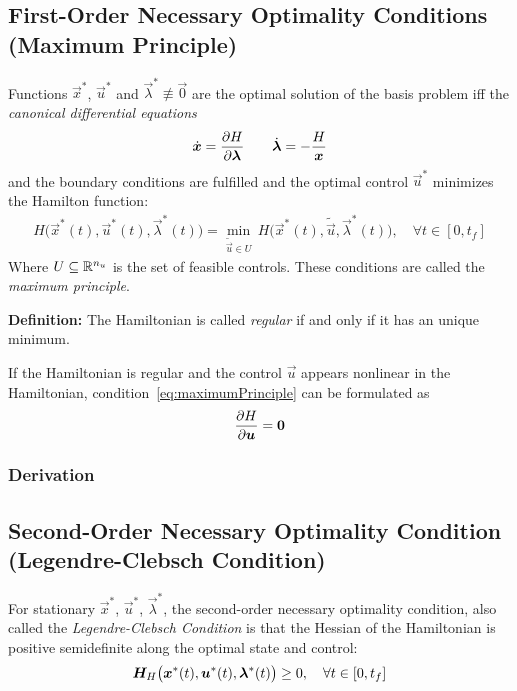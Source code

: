 		\subsection{First-Order Necessary Optimality Conditions (Maximum Principle)}
			Functions \( \vec{x}^\ast \), \( \vec{u}^\ast \) and \( \vec{\lambda}^\ast \not\equiv \vec{0} \) are the optimal solution of the basis problem iff the \emph{canonical differential equations}
			\begin{align*}
				\dot{\bm{x}} = \pdv{H}{\bm{\lambda}} \qquad \dot{\bm{\lambda}} = -\frac{H}{\bm{x}}
			\end{align*}
			and the boundary conditions are fulfilled and the optimal control \(\vec{u}^\ast\) minimizes the Hamilton function:
			\begin{align}
				H\big(\vec{x}^\ast(t), \vec{u}^\ast(t), \vec{\lambda}^\ast(t)\big) = \min_{\tilde{\vec{u}} \in U} \, H\big(\vec{x}^\ast(t), \tilde{\vec{u}}, \vec{\lambda}^\ast(t)\big),\quad \forall t \in [0, t_f]  \label{eq:maximumPrinciple}
			\end{align}
			Where \( U \subseteq \mathbb{R}^{n_u} \) is the set of feasible controls. These conditions are called the \emph{maximum principle}.

			\textbf{Definition:} The Hamiltonian is called \emph{regular} if and only if it has an unique minimum.

			If the Hamiltonian is regular and the control \(\vec{u}\) appears nonlinear in the Hamiltonian, condition~\eqref{eq:maximumPrinciple} can be formulated as
			\begin{align*}
				\pdv{H}{\bm{u}} = \bm{0}
			\end{align*}

			\subsubsection{Derivation} %

		\subsection{Second-Order Necessary Optimality Condition (Legendre-Clebsch Condition)} %
			For stationary \(\vec{x}^\ast\), \(\vec{u}^\ast\), \(\vec{\lambda}^\ast\), the second-order necessary optimality condition, also called the \emph{Legendre-Clebsch Condition} is that the Hessian of the Hamiltonian is positive semidefinite along the optimal state and control:
			\begin{align*}
				\bm{H}_H\big(\bm{x}^\ast(t), \bm{u}^\ast(t), \bm{\lambda}^\ast(t)\big) \geq 0,\quad \forall t \in [0, t_f]
			\end{align*}

